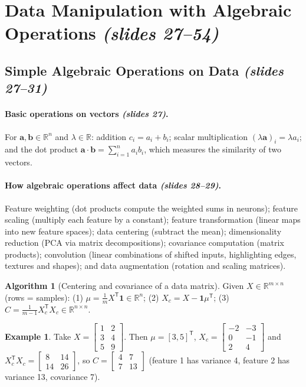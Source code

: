 \documentclass[11pt,a4paper]{article}
\newcommand{\R}{\mathbb{R}}
\newcommand{\T}{^{\mathsf{T}}}
\newcommand{\slides}[1]{\texorpdfstring{\emph{(slides #1)}}{(slides #1)}}
\theoremstyle{definition}
\newtheorem{example}[definition]{Example}
\newtheorem{algorithm}[definition]{Algorithm}
\theoremstyle{plain}
\begin{document}
\section{Data Manipulation with Algebraic Operations \slides{27--54}}

\subsection{Simple Algebraic Operations on Data \slides{27--31}}

\paragraph{Basic operations on vectors \slides{27}.} For $\mathbf a,\mathbf b\in\R^n$ and $\lambda\in\R$: addition $c_i=a_i+b_i$; scalar multiplication $(\lambda\mathbf a)_i=\lambda a_i$; and the dot product $\mathbf a\cdot\mathbf b=\sum_{i=1}^n a_ib_i$, which measures the similarity of two vectors.

\paragraph{How algebraic operations affect data \slides{28--29}.} Feature weighting (dot products compute the weighted sums in neurons); feature scaling (multiply each feature by a constant); feature transformation (linear maps into new feature spaces); data centering (subtract the mean); dimensionality reduction (PCA via matrix decompositions); covariance computation (matrix products); convolution (linear combinations of shifted inputs, highlighting edges, textures and shapes); and data augmentation (rotation and scaling matrices).

\begin{algorithm}[Centering and covariance of a data matrix]\label{alg:cov}
Given $X\in\R^{m\times n}$ (rows = samples): (1) $\mu=\tfrac1m X\T\mathbf 1\in\R^n$; (2) $X_c=X-\mathbf 1\mu\T$; (3) $C=\tfrac1{m-1}X_c\T X_c\in\R^{n\times n}$.
\end{algorithm}

\begin{example}
Take $X=\begin{bmatrix}1&2\\3&4\\5&9\end{bmatrix}$. Then $\mu=[3,5]\T$, $X_c=\begin{bmatrix}-2&-3\\0&-1\\2&4\end{bmatrix}$ and
$X_c\T X_c=\begin{bmatrix}8&14\\14&26\end{bmatrix}$, so $C=\begin{bmatrix}4&7\\7&13\end{bmatrix}$ (feature 1 has variance 4, feature 2 has variance 13, covariance 7).
\end{example}
\end{document}
